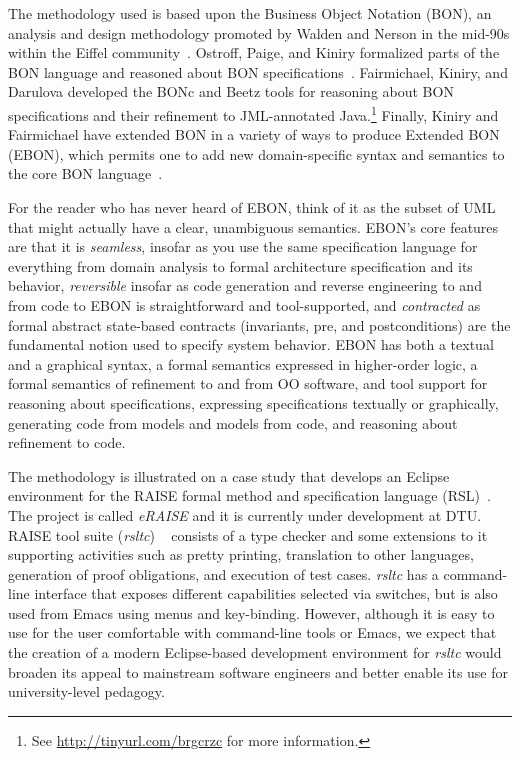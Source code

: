 \documentclass[conference]{IEEEtran}
\begin{document}
The methodology used is based upon the Business Object Notation (BON),
an analysis and design methodology promoted by Walden and Nerson in
the mid-90s within the Eiffel community~\cite{WaldenNerson95}.
Ostroff, Paige, and Kiniry formalized parts of the BON language and
reasoned about BON
specifications~\cite{LancaricOstroffPaige02,EBON01,PaigeEtal02,PaigeOstroff01b}.
Fairmichael, Kiniry, and Darulova developed the BONc and Beetz tools
for reasoning about BON specifications and their refinement to
JML-annotated Java.\footnote{See \url{http://tinyurl.com/brgcrzc} for
  more information.}  Finally, Kiniry and Fairmichael have extended
BON in a variety of ways to produce Extended BON (EBON), which permits
one to add new domain-specific syntax and semantics to the core BON
language~\cite{Kiniry02-PhDThesis}.

For the reader who has never heard of EBON, think of it as the subset
of UML that might actually have a clear, unambiguous semantics.
EBON's core features are that it is \emph{seamless}, insofar as you
use the same specification language for everything from domain
analysis to formal architecture specification and its behavior,
\emph{reversible} insofar as code generation and reverse engineering
to and from code to EBON is straightforward and tool-supported, and
\emph{contracted} as formal abstract state-based contracts
(invariants, pre, and postconditions) are the fundamental notion used
to specify system behavior.  EBON has both a textual and a graphical
syntax, a formal semantics expressed in higher-order logic, a formal
semantics of refinement to and from OO software, and tool support for
reasoning about specifications, expressing specifications textually or
graphically, generating code from models and models from code, and
reasoning about refinement to code.

The methodology is illustrated on a case study that develops an
Eclipse environment for the RAISE formal method%
and specification language (RSL)~\cite{RLG92}. The project is called
\emph{eRAISE} and it is currently under development at DTU.
RAISE tool suite (\emph{rsltc}) ~\cite{rsltcUserGuide,RAISETools2003}
consists of a type checker and some extensions to it supporting
activities such as pretty printing, %
translation to other languages, generation of proof obligations,
and execution of test cases.
\emph{rsltc} has a command-line interface that exposes different
capabilities selected via switches, but is also used from Emacs using
menus and key-binding. However, although it is easy to use for the
user comfortable with command-line tools or Emacs, we expect that the
creation of a modern Eclipse-based development environment for
\emph{rsltc} would broaden its appeal to mainstream software engineers
and better enable its use for university-level pedagogy.
\end{document}
